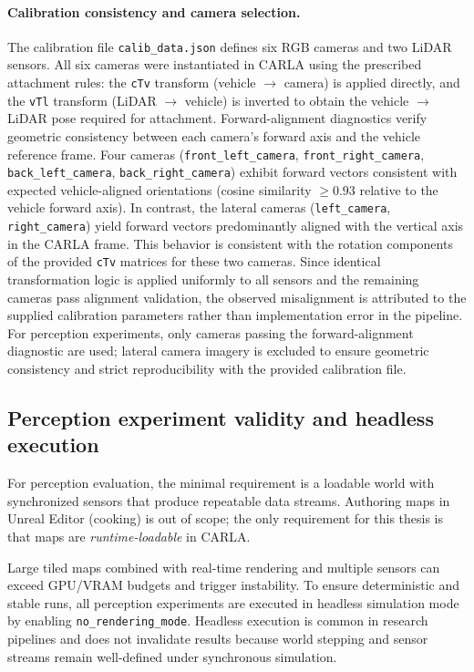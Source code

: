 \paragraph{Calibration consistency and camera selection.}
The calibration file \texttt{calib\_data.json} defines six RGB cameras and two LiDAR sensors.
All six cameras were instantiated in CARLA using the prescribed attachment rules: the \texttt{cTv} transform (vehicle $\rightarrow$ camera) is applied directly, and the \texttt{vTl} transform (LiDAR $\rightarrow$ vehicle) is inverted to obtain the vehicle $\rightarrow$ LiDAR pose required for attachment.
Forward-alignment diagnostics verify geometric consistency between each camera's forward axis and the vehicle reference frame.
Four cameras (\texttt{front\_left\_camera}, \texttt{front\_right\_camera}, \texttt{back\_left\_camera}, \texttt{back\_right\_camera}) exhibit forward vectors consistent with expected vehicle-aligned orientations (cosine similarity $\geq 0.93$ relative to the vehicle forward axis).
In contrast, the lateral cameras (\texttt{left\_camera}, \texttt{right\_camera}) yield forward vectors predominantly aligned with the vertical axis in the CARLA frame.
This behavior is consistent with the rotation components of the provided \texttt{cTv} matrices for these two cameras.
Since identical transformation logic is applied uniformly to all sensors and the remaining cameras pass alignment validation, the observed misalignment is attributed to the supplied calibration parameters rather than implementation error in the pipeline.
For perception experiments, only cameras passing the forward-alignment diagnostic are used; lateral camera imagery is excluded to ensure geometric consistency and strict reproducibility with the provided calibration file.

\subsection{Perception experiment validity and headless execution}
\label{sec:perception_validity}
For perception evaluation, the minimal requirement is a loadable world with synchronized sensors that produce repeatable data streams.
Authoring maps in Unreal Editor (cooking) is out of scope; the only requirement for this thesis is that maps are \emph{runtime-loadable} in CARLA.

Large tiled maps combined with real-time rendering and multiple sensors can exceed GPU/VRAM budgets and trigger instability.
To ensure deterministic and stable runs, all perception experiments are executed in headless simulation mode by enabling \texttt{no\_rendering\_mode}.
Headless execution is common in research pipelines and does not invalidate results because world stepping and sensor streams remain well-defined under synchronous simulation.


